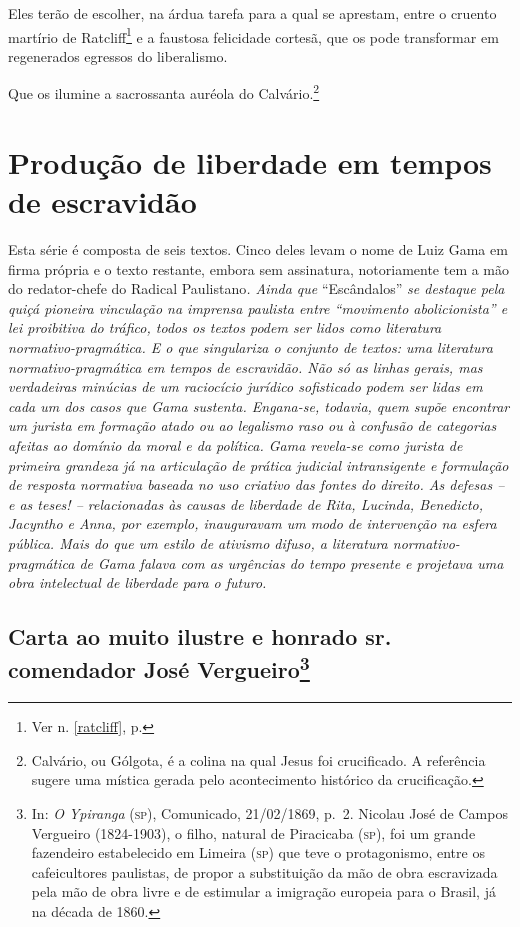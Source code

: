 Eles terão de escolher, na árdua tarefa para a qual se aprestam, entre o
cruento martírio de Ratcliff\footnote{Ver n. \ref{ratcliff}, p. \pageref{ratcliff}} 
e a faustosa felicidade cortesã, que os pode transformar em regenerados 
egressos do liberalismo.

Que os ilumine a sacrossanta auréola do Calvário.\footnote{Calvário,
  ou Gólgota, é a colina na qual Jesus foi crucificado. A referência
  sugere uma mística gerada pelo acontecimento histórico da
  crucificação.}

\part{Produção de liberdade em tempos de escravidão} %

\begin{argumento}
Esta série é composta de seis textos. Cinco deles levam o nome de Luiz
Gama em firma própria e o texto restante, embora sem assinatura,
notoriamente tem a mão do redator-chefe do Radical Paulistano\emph{.
Ainda que} ``Escândalos'' \emph{se destaque pela quiçá pioneira vinculação
na imprensa paulista entre ``movimento abolicionista'' e lei proibitiva do
tráfico, todos os textos podem ser lidos como literatura
normativo-pragmática. E o que singulariza o conjunto de textos: uma
literatura normativo-pragmática em tempos de escravidão. Não só as
linhas gerais, mas verdadeiras minúcias de um raciocício jurídico
sofisticado podem ser lidas em cada um dos casos que Gama sustenta.
Engana-se, todavia, quem supõe encontrar um jurista em formação atado ou
ao legalismo raso ou à confusão de categorias afeitas ao domínio da
moral e da política. Gama revela-se como jurista de primeira grandeza já
na articulação de prática judicial intransigente e formulação de
resposta normativa baseada no uso criativo das fontes do direito. As
defesas -- e as teses! -- relacionadas às causas de liberdade de Rita,
Lucinda, Benedicto, Jacyntho e Anna, por exemplo, inauguravam um modo de
intervenção na esfera pública. Mais do que um estilo de ativismo difuso,
a literatura normativo-pragmática de Gama falava com as urgências do
tempo presente e projetava uma obra intelectual de liberdade para o
futuro.}
\end{argumento}

\chapter{Carta ao muito ilustre e honrado sr.\,comendador José
Vergueiro\footnote{In: \emph{O Ypiranga} (\textsc{sp}), Comunicado, 21/02/1869,
  p.~2. Nicolau José de Campos Vergueiro (1824-1903), o filho, natural
  de Piracicaba (\textsc{sp}), foi um grande fazendeiro estabelecido em Limeira
  (\textsc{sp}) que teve o protagonismo, entre os cafeicultores paulistas, de
  propor a substituição da mão de obra escravizada pela mão de obra
  livre e de estimular a imigração europeia para o Brasil, já na década
  de 1860.}}

